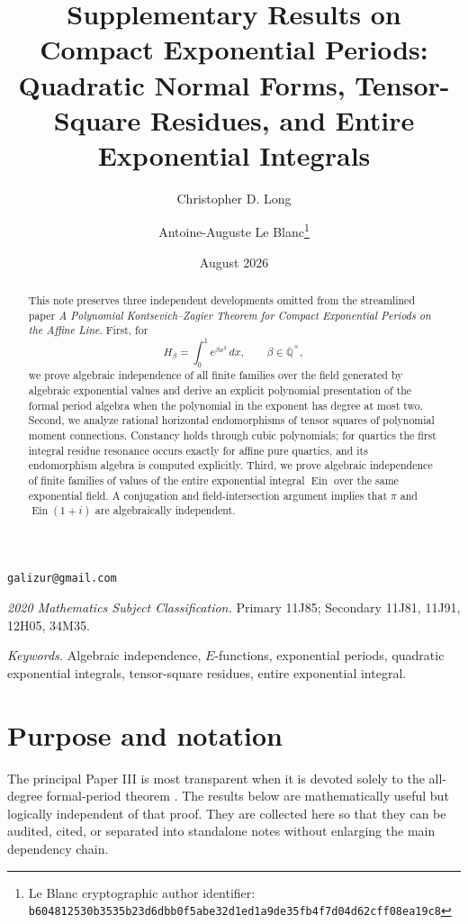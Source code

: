 \documentclass[11pt]{article}
\title{Supplementary Results on Compact Exponential Periods:\\
Quadratic Normal Forms, Tensor-Square Residues, and Entire Exponential Integrals}
\author{Christopher D. Long \and Antoine-Auguste Le Blanc\thanks{Le Blanc cryptographic author identifier: \texttt{b6048125\allowbreak{}30b3535b\allowbreak{}23d6dbb0\allowbreak{}f5abe32d\allowbreak{}1ed1a9de\allowbreak{}35fb4f7d\allowbreak{}04d62cff\allowbreak{}08ea19c8}}}
\date{August 2026}
\numberwithin{equation}{section}
\theoremstyle{definition}
\theoremstyle{remark}
\begin{document}
\maketitle

\begin{center}
\small
\texttt{galizur@gmail.com}
\end{center}

\begin{abstract}
This note preserves three independent developments omitted from the streamlined
paper \emph{A Polynomial Kontsevich--Zagier Theorem for Compact Exponential
Periods on the Affine Line}.  First, for
\[
  H_\beta=\int_0^1e^{\beta x^2}\,dx,
  \qquad \beta\in\overline{\mathbb Q}^{\times},
\]
we prove algebraic independence of all finite families over the field
generated by algebraic exponential values and derive an explicit polynomial
presentation of the formal period algebra when the polynomial in the
exponent has degree at most two.  Second, we analyze rational horizontal
endomorphisms of tensor squares of polynomial moment connections.  Constancy
holds through cubic polynomials; for quartics the first integral residue
resonance occurs exactly for affine pure quartics, and its endomorphism
algebra is computed explicitly.  Third, we prove algebraic independence of
finite families of values of the entire exponential integral
$\operatorname{Ein}$ over the same exponential field.  A conjugation and
field-intersection argument implies that $\pi$ and $\operatorname{Ein}(1+i)$
are algebraically independent.
\end{abstract}

\medskip
\noindent\textit{2020 Mathematics Subject Classification.}
Primary 11J85; Secondary 11J81, 11J91, 12H05, 34M35.

\noindent\textit{Keywords.}
Algebraic independence, $E$-functions, exponential periods, quadratic
exponential integrals, tensor-square residues, entire exponential integral.

\section{Purpose and notation}

The principal Paper III is most transparent when it is devoted solely to the
all-degree formal-period theorem \cite{LongPolynomialKZ}.  The results below
are mathematically useful but logically independent of that proof.  They are
collected here so that they can be audited, cited, or separated into
standalone notes without enlarging the main dependency chain.
\end{document}

